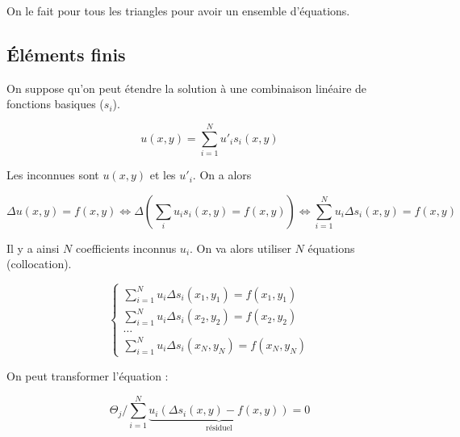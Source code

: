 	On le fait pour tous les triangles pour avoir un ensemble d'équations.
	
	
	\subsection{Éléments finis}
	
	On suppose qu'on peut étendre la solution à une combinaison linéaire de fonctions basiques ($s_i$).
	
	$$u(x, y) = \sum_{i = 1}^N u'_i s_i(x, y)$$
	
	Les inconnues sont $u(x, y)$ et les $u'_i$. On a alors
	
	$$\Delta u(x, y) = f(x, y) \Leftrightarrow \Delta (\sum_i u_i s_i(x, y) = f(x, y)) \Leftrightarrow \sum_{i = 1}^N u_i \Delta s_i(x, y) = f(x, y)$$
	
	Il y a ainsi $N$ coefficients inconnus $u_i$. On va alors utiliser $N$ équations (collocation).
	
	$$\left\{
	\begin{array}{l}
	\sum_{i = 1}^N u_i \Delta s_i(x_1, y_1) = f(x_1, y_1) \\
	\sum_{i = 1}^N u_i \Delta s_i(x_2, y_2) = f(x_2, y_2) \\
	\dots \\
	\sum_{i = 1}^N u_i \Delta s_i(x_N, y_N) = f(x_N, y_N)
\end{array}
\right.$$

	On peut transformer l'équation :
	
	$$\Theta_j / \sum_{i = 1}^N \underbrace{u_i (\Delta s_i(x, y) - f(x, y))}_{\text{résiduel}} = 0$$
	
	
